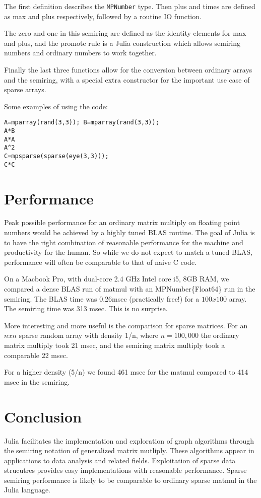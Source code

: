 \documentclass[conference]{IEEEtran}
\begin{document}
The first definition describes the \verb+MPNumber+ type.
Then plus and times are defined as max and plus respectively, followed by
a routine IO function.

The zero and one in this semiring are defined as the identity elements for max and plus,
and the promote rule is a Julia construction which allows semiring numbers and ordinary
numbers to work together.

Finally the last three functions allow for the conversion between ordinary arrays and the semiring, with a special extra constructor for the important use case of sparse arrays.

Some examples of using the code:


\begin{verbatim}
A=mparray(rand(3,3)); B=mparray(rand(3,3));
A*B
A*A
A^2
C=mpsparse(sparse(eye(3,3)));
C*C
\end{verbatim}





\section{Performance}

Peak possible performance for an ordinary matrix multiply on floating point numbers
would be achieved by a highly tuned BLAS routine.
The goal of Julia is to have the right combination of reasonable performance
for the machine and productivity for the human.  So while we do not expect to match
a tuned BLAS, performance will often be comparable to that of naive C code.

On a Macbook Pro, with dual-core 2.4 GHz Intel core i5, 8GB RAM, we compared a dense BLAS run of matmul with an MPNumber\{Float64\} run in the semiring.
The BLAS time was 0.26msec (practically free!) for a $100x100$ array.  The semiring time
was 313 msec.  This is no surprise.

More interesting and more useful is the comparison for sparse matrices.  For an $n x n$ sparse random array with density 1/n, where $n = 100,000$ the ordinary matrix multiply took 21 msec, and the semiring matrix multiply took a comparable 22 msec.

For a higher density (5/n) we found 461 msec for the matmul compared to 414 msec in the semiring.




\section{Conclusion}

Julia facilitates the implementation and exploration of graph algorithms through
the semiring notation of generalized matrix mutliply.  These algorithms appear
in applications to data analysis and related fields.  Exploitation of sparse data
strucutres provides easy implementations with reasonable performance.
Sparse semiring performance is likely to be comparable to ordinary sparse matmul in the Julia
language.




\end{document}
